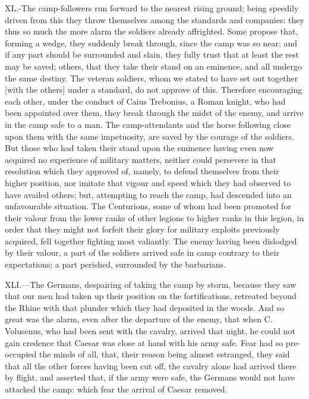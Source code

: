 XL.-The camp-followers run forward to the nearest rising ground; being
speedily driven from this they throw themselves among the standards and
companies: they thus so much the more alarm the soldiers already
affrighted. Some propose that, forming a wedge, they suddenly break
through, since the camp was so near; and if any part should be
surrounded and slain, they fully trust that at least the rest may be
saved; others, that they take their stand on an eminence, and all
undergo the same destiny. The veteran soldiers, whom we stated to have
set out together [with the others] under a standard, do not approve of
this. Therefore encouraging each other, under the conduct of Caius
Trebonius, a Roman knight, who had been appointed over them, they break
through the midst of the enemy, and arrive in the camp safe to a man.
The camp-attendants and the horse following close upon them with the
same impetuosity, are saved by the courage of the soldiers. But those
who had taken their stand upon the eminence having even now acquired no
experience of military matters, neither could persevere in that
resolution which they approved of, namely, to defend themselves from
their higher position, nor imitate that vigour and speed which they had
observed to have availed others; but, attempting to reach the camp, had
descended into an unfavourable situation. The Centurions, some of whom
had been promoted for their valour from the lower ranks of other legions
to higher ranks in this legion, in order that they might not forfeit
their glory for military exploits previously acquired, fell together
fighting most valiantly. The enemy having been dislodged by their
valour, a part of the soldiers arrived safe in camp contrary to their
expectations; a part perished, surrounded by the barbarians.

XLI.—The Germans, despairing of taking the camp by storm, because they
saw that our men had taken up their position on the fortifications,
retreated beyond the Rhine with that plunder which they had deposited in
the woods. And so great was the alarm, even after the departure of the
enemy, that when C. Volusenus, who had been sent with the cavalry,
arrived that night, he could not gain credence that Caesar was close at
hand with his army safe. Fear had so pre-occupied the minds of all,
that, their reason being almost estranged, they said that all the other
forces having been cut off, the cavalry alone had arrived there by
flight, and asserted that, if the army were safe, the Germans would not
have attacked the camp: which fear the arrival of Caesar removed.

